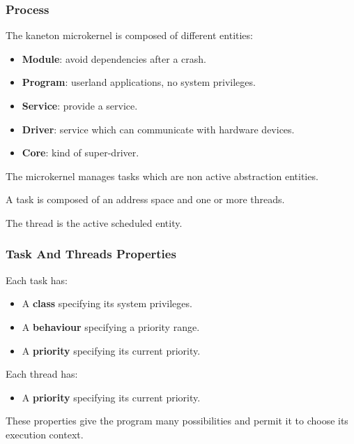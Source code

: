 \begin{frame}
  \frametitle{Process}

  The kaneton microkernel is composed of different entities:

  \begin{itemize}
    \item
      \textbf{Module}: avoid dependencies after a crash.
    \item
      \textbf{Program}: userland applications, no system privileges.
    \item
      \textbf{Service}: provide a service.
    \item
      \textbf{Driver}: service which can communicate with hardware devices.
    \item
      \textbf{Core}: kind of super-driver.
  \end{itemize}

  \nl

  The microkernel manages tasks which are non active abstraction entities.

  \nl

  A task is composed of an address space and one or more threads.

  \nl

  The thread is the active scheduled entity.
\end{frame}


\begin{frame}
  \frametitle{Task And Threads Properties}

  Each task has:

  \begin{itemize}
    \item
      A \textbf{class} specifying its system privileges.
    \item
      A \textbf{behaviour} specifying a priority range.
    \item
      A \textbf{priority} specifying its current priority.
  \end{itemize}

  \nl

  Each thread has:

  \begin{itemize}
    \item
      A \textbf{priority} specifying its current priority.
  \end{itemize}

  \nl

  These properties give the program many possibilities and
  permit it to choose its execution context.
\end{frame}

